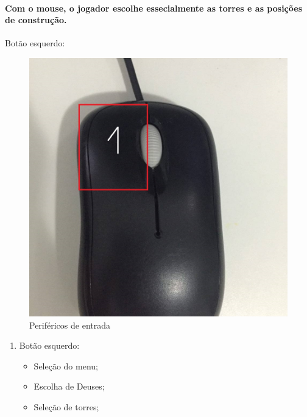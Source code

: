 \documentclass[11pt]{article} %
\begin{document}
\paragraph{Com o mouse, o jogador escolhe essecialmente as torres e as posições de construção.}
Botão esquerdo:
\begin{figure}[!htp]
\begin{center}
  \includegraphics[scale=0.1]{res/mouse.png} \quad
\caption{Periféricos de entrada} \label{gdimotes}
\end{center}
\end{figure}
\begin{enumerate}
\item Botão esquerdo:
\begin{itemize}
\item Seleção do menu;
\item Escolha de Deuses;
\item Seleção de torres;
\end{itemize}
\end{enumerate}
\end{document}
